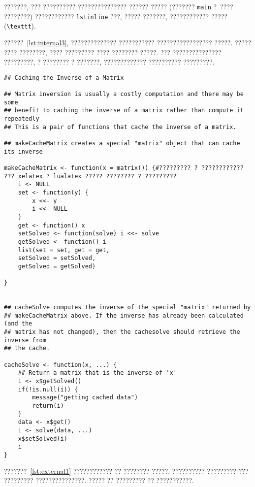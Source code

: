 ???????, ??? ?????????? ??????????????? ?????? ?????
(??????? \lstinline{main} ?~???? ????????) ????????????
\texttt{lstinline} ???, ????? ???????, ???????????? ?????
(\texttt{\textbackslash texttt}).

??????~\cref{lst:internal3}, ?????????????? ??????????? ?????????????????
?????. ????? ???? ????????, ???? ????????? ???? ???????? ?????. ???
??????????????? ?????????, ? ???????? ? ???????, ????????????? ??????????
?????????.
\begingroup
\captiondelim{ } %
\begin{lstlisting}[language={Renhanced},caption={?????? ???????? c ???????? ???????????? ??????????},label={lst:internal3}]
## Caching the Inverse of a Matrix

## Matrix inversion is usually a costly computation and there may be some
## benefit to caching the inverse of a matrix rather than compute it repeatedly
## This is a pair of functions that cache the inverse of a matrix.

## makeCacheMatrix creates a special "matrix" object that can cache its inverse

makeCacheMatrix <- function(x = matrix()) {#????????? ? ???????????? ??? xelatex ? lualatex ????? ???????? ? ?????????
    i <- NULL
    set <- function(y) {
        x <<- y
        i <<- NULL
    }
    get <- function() x
    setSolved <- function(solve) i <<- solve
    getSolved <- function() i
    list(set = set, get = get,
    setSolved = setSolved,
    getSolved = getSolved)

}


## cacheSolve computes the inverse of the special "matrix" returned by
## makeCacheMatrix above. If the inverse has already been calculated (and the
## matrix has not changed), then the cachesolve should retrieve the inverse from
## the cache.

cacheSolve <- function(x, ...) {
    ## Return a matrix that is the inverse of 'x'
    i <- x$getSolved()
    if(!is.null(i)) {
        message("getting cached data")
        return(i)
    }
    data <- x$get()
    i <- solve(data, ...)
    x$setSolved(i)
    i
}
\end{lstlisting} %
\endgroup

???????~\cref{lst:external1} ???????????? ?? ???????? ?????. ??????????
????????? ??? ????????? ???????????????. ????? ?? ????????? ?? ???????????.
\begingroup
\captiondelim{ } %

\endgroup

